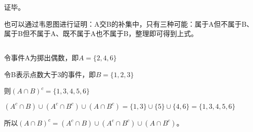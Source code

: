 \documentclass[UTF8]{article}
\begin{document}
            证毕。

            也可以通过韦恩图进行证明：A交B的补集中，只有三种可能：属于A但不属于B、属于B但不属于A、既不属于A也不属于B，整理即可得到上式。
        
        \subsection{}
            令事件A为掷出偶数，即$A = \{2, 4, 6\}$
        
            令B表示点数大于3的事件，即$B = \{1, 2, 3\}$

            则$(A \cap B)^c = \{1, 3, 4, 5, 6\}$

            $(A^c \cap B) \cup  (A^c \cap B^c) \cup (A \cap B^c) = \{1, 3\} \cup \{5\} \cup \{4, 6\} = \{1, 3, 4, 5, 6\}$

            所以$(A \cap B)^c = (A^c \cap B) \cup  (A^c \cap B^c) \cup (A \cap B^c)$。
\end{document}
